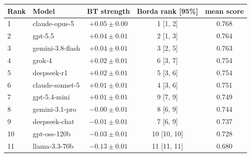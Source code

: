 \begin{tabular}{llccc}
\toprule
Rank & Model & BT strength & Borda rank [95\%] & mean score \\
\midrule
1 & claude-opus-5 & $+0.05 \pm 0.00$ & 1 [1, 2] & 0.768 \\
2 & gpt-5.5 & $+0.04 \pm 0.01$ & 2 [1, 3] & 0.764 \\
3 & gemini-3.8-flash & $+0.04 \pm 0.01$ & 3 [2, 5] & 0.763 \\
4 & grok-4 & $+0.02 \pm 0.01$ & 6 [3, 7] & 0.754 \\
5 & deepseek-r1 & $+0.02 \pm 0.01$ & 5 [3, 6] & 0.754 \\
6 & claude-sonnet-5 & $+0.01 \pm 0.01$ & 4 [3, 6] & 0.751 \\
7 & gpt-5.4-mini & $+0.01 \pm 0.01$ & 9 [7, 9] & 0.749 \\
8 & gemini-3.1-pro & $-0.00 \pm 0.01$ & 8 [6, 9] & 0.744 \\
9 & deepseek-chat & $-0.01 \pm 0.01$ & 7 [6, 9] & 0.737 \\
10 & gpt-oss-120b & $-0.03 \pm 0.01$ & 10 [10, 10] & 0.728 \\
11 & llama-3.3-70b & $-0.13 \pm 0.01$ & 11 [11, 11] & 0.680 \\
\bottomrule
\end{tabular}
